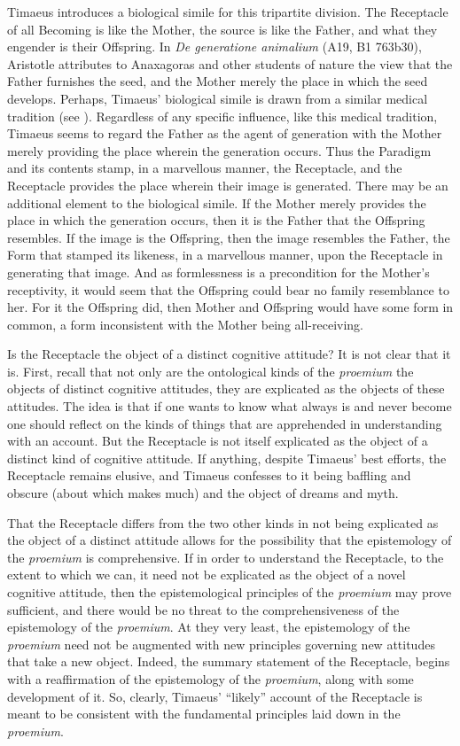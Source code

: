 Timaeus introduces a biological simile for this tripartite division. The Receptacle of all Becoming is like the Mother, the source is like the Father, and what they engender is their Offspring.  In \emph{De generatione animalium} (A19, B1 763b30), Aristotle attributes to Anaxagoras and other students of nature the view that the Father furnishes the seed, and the Mother merely the place in which the seed develops. Perhaps, Timaeus' biological simile is drawn from a similar medical tradition (see \citealt[187]{Cornford:1935fk}). Regardless of any specific influence, like this medical tradition, Timaeus seems to regard the Father as the agent of generation with the Mother merely providing the place wherein the generation occurs. Thus the Paradigm and its contents stamp, in a marvellous manner, the Receptacle, and the Receptacle provides the place wherein their image is generated. There may be an additional element to the biological simile. If the Mother merely provides the place in which the generation occurs, then it is the Father that the Offspring resembles. If the image is the Offspring, then the image resembles the Father, the Form that stamped its likeness, in a marvellous manner, upon the Receptacle in generating that image. And as formlessness is a precondition for the Mother's receptivity, it would seem that the Offspring could bear no family resemblance to her. For it the Offspring did, then Mother and Offspring would have some form in common, a form inconsistent with the Mother being all-receiving. 

Is the Receptacle the object of a distinct cognitive attitude? It is not clear that it is. First, recall that not only are the ontological kinds of the \emph{proemium} the objects of distinct cognitive attitudes, they are explicated as the objects of these attitudes. The idea is that if one wants to know what always is and never become one should reflect on the kinds of things that are apprehended in understanding with an account. But the Receptacle is not itself explicated as the object of a distinct kind of cognitive attitude. If anything, despite Timaeus' best efforts, the Receptacle remains elusive, and Timaeus confesses to it being baffling and obscure (about which \citealt{Derrida:1993aa} makes much) and the object of dreams and myth.

That the Receptacle differs from the two other kinds in not being explicated as the object of a distinct attitude allows for the possibility that the epistemology of the \emph{proemium} is comprehensive. If in order to understand the Receptacle, to the extent to which we can, it need not be explicated as the object of a novel cognitive attitude, then the epistemological principles of the \emph{proemium} may prove sufficient, and there would be no threat to the comprehensiveness of the epistemology of the \emph{proemium}. At they very least, the epistemology of the \emph{proemium} need not be augmented with new principles governing new attitudes that take a new object. Indeed, the summary statement of the Receptacle, begins with a reaffirmation of the epistemology of the \emph{proemium}, along with some development of it. So, clearly, Timaeus' ``likely'' account of the Receptacle is meant to be consistent with the fundamental principles laid down in the \emph{proemium}.


